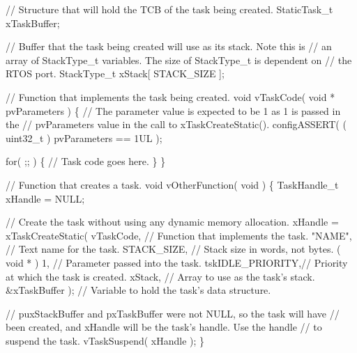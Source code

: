 \begin{DoxyPre}   // Structure that will hold the TCB of the task being created.
   StaticTask\_t xTaskBuffer;\end{DoxyPre}



\begin{DoxyPre}   // Buffer that the task being created will use as its stack.  Note this is
   // an array of StackType\_t variables.  The size of StackType\_t is dependent on
   // the RTOS port.
   StackType\_t xStack[ STACK\_SIZE ];\end{DoxyPre}



\begin{DoxyPre}   // Function that implements the task being created.
   void vTaskCode( void * pvParameters )
   \{
       // The parameter value is expected to be 1 as 1 is passed in the
       // pvParameters value in the call to xTaskCreateStatic().
       configASSERT( ( uint32\_t ) pvParameters == 1UL );\end{DoxyPre}



\begin{DoxyPre}       for( ;; )
       \{
           // Task code goes here.
       \}
   \}\end{DoxyPre}



\begin{DoxyPre}   // Function that creates a task.
   void vOtherFunction( void )
   \{
       TaskHandle\_t xHandle = NULL;\end{DoxyPre}



\begin{DoxyPre}       // Create the task without using any dynamic memory allocation.
       xHandle = xTaskCreateStatic(
                     vTaskCode,       // Function that implements the task.
                     "NAME",          // Text name for the task.
                     STACK\_SIZE,      // Stack size in words, not bytes.
                     ( void * ) 1,    // Parameter passed into the task.
                     tskIDLE\_PRIORITY,// Priority at which the task is created.
                     xStack,          // Array to use as the task's stack.
                     \&xTaskBuffer );  // Variable to hold the task's data structure.\end{DoxyPre}



\begin{DoxyPre}       // puxStackBuffer and pxTaskBuffer were not NULL, so the task will have
       // been created, and xHandle will be the task's handle.  Use the handle
       // to suspend the task.
       vTaskSuspend( xHandle );
   \}
  \end{DoxyPre}
 